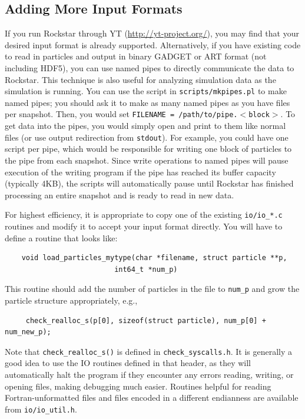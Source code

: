 \documentclass[12pt]{article}
\begin{document}
\subsection{Adding More Input Formats}
\label{s:input_formats}
	If you run Rockstar through YT (\url{http://yt-project.org/}), you may find that your desired input format is already supported.  Alternatively, if you have existing code to read in particles and output in binary GADGET or ART format (not including HDF5), you can use named pipes to directly communicate the data to Rockstar.  This technique is also useful for analyzing simulation data as the simulation is running.  You can use the script in \texttt{scripts/mkpipes.pl} to make named pipes; you should ask it to make as many named pipes as you have files per snapshot.  Then, you would set \texttt{FILENAME = /path/to/pipe.$<$block$>$}.  To get data into the pipes, you would simply open and print to them like normal files (or use output redirection from \texttt{stdout}).  For example, you could have one script per pipe, which would be responsible for writing one block of particles to the pipe from each snapshot.  Since write operations to named pipes will pause execution of the writing program if the pipe has reached its buffer capacity (typically 4KB), the scripts will automatically pause until Rockstar has finished processing an entire snapshot and is ready to read in new data.
	
For highest efficiency, it is appropriate to copy one of the existing \texttt{io/io\_*.c} routines and modify it to accept your input format directly.  You will have to define a routine that looks like:
\begin{verbatim}
    void load_particles_mytype(char *filename, struct particle **p, 
	       				  int64_t *num_p)
\end{verbatim}					  
This routine should add the number of particles in the file to \texttt{num\_p} and grow the particle structure appropriately, e.g.,
\begin{verbatim}
     check_realloc_s(p[0], sizeof(struct particle), num_p[0] + num_new_p);
\end{verbatim}
Note that \texttt{check\_realloc\_s()} is defined in \texttt{check\_syscalls.h}.  It is generally a good idea to use the IO routines defined in that header, as they will automatically halt the program if they encounter any errors reading, writing, or opening files, making debugging much easier.  Routines helpful for reading Fortran-unformatted files and files encoded in a different endianness are available from \texttt{io/io\_util.h}.
\end{document}
